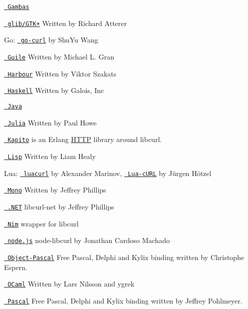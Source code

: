 \href{https://gambas.sourceforge.io/}{\texttt{ Gambas}}

\href{https://web.archive.org/web/20100526203452/atterer.net/glibcurl}{\texttt{ glib/\+GTK+}} Written by Richard Atterer

Go\+: \href{https://github.com/andelf/go-curl}{\texttt{ go-\/curl}} by Shu\+Yu Wang

\href{https://www.lonelycactus.com/guile-curl.html}{\texttt{ Guile}} Written by Michael L. Gran

\href{https://github.com/vszakats/hb/tree/master/contrib/hbcurl}{\texttt{ Harbour}} Written by Viktor Szakats

\href{https://hackage.haskell.org/cgi-bin/hackage-scripts/package/curl}{\texttt{ Haskell}} Written by Galois, Inc

\href{https://github.com/pjlegato/curl-java}{\texttt{ Java}}

\href{https://github.com/forio/Curl.jl}{\texttt{ Julia}} Written by Paul Howe

\href{https://github.com/puzza007/katipo}{\texttt{ Kapito}} is an Erlang \mbox{\hyperlink{struct_h_t_t_p}{HTTP}} library around libcurl.

\href{https://common-lisp.net/project/cl-curl/}{\texttt{ Lisp}} Written by Liam Healy

Lua\+: \href{https://web.archive.org/web/20201205052437/luacurl.luaforge.net/}{\texttt{ luacurl}} by Alexander Marinov, \href{https://github.com/Lua-cURL}{\texttt{ Lua-\/c\+URL}} by Jürgen Hötzel

\href{https://forge.novell.com/modules/xfmod/project/?libcurl-mono}{\texttt{ Mono}} Written by Jeffrey Phillips

\href{https://sourceforge.net/projects/libcurl-net/}{\texttt{ .NET}} libcurl-\/net by Jeffrey Phillips

\href{https://nimble.directory/pkg/libcurl}{\texttt{ Nim}} wrapper for libcurl

\href{https://github.com/JCMais/node-libcurl}{\texttt{ node.\+js}} node-\/libcurl by Jonathan Cardoso Machado

\href{https://web.archive.org/web/20020610214926/www.tekool.com/opcurl}{\texttt{ Object-\/\+Pascal}} Free Pascal, Delphi and Kylix binding written by Christophe Espern.

\href{https://opam.ocaml.org/packages/ocurl/}{\texttt{ OCaml}} Written by Lars Nilsson and ygrek

\href{https://web.archive.org/web/20030804091414/houston.quik.com/jkp/curlpas/}{\texttt{ Pascal}} Free Pascal, Delphi and Kylix binding written by Jeffrey Pohlmeyer.


